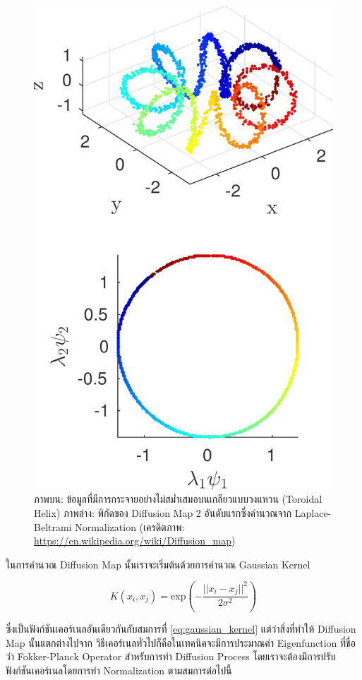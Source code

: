 \begin{figure}[htbp]
    \centering
    \includegraphics[width=0.7\linewidth]{fig/diffusion_map.jpg}
    \caption{ภาพบน: ข้อมูลที่มีการกระจายอย่างไม่สม่ำเสมอบนเกลียวแบบวงแหวน (Toroidal Helix) ภาพล่าง: พิกัดของ Diffusion Map 
    2 อันดับแรกซึ่งคำนวณจาก Laplace-Beltrami Normalization 
    (เครดิตภาพ: \url{https://en.wikipedia.org/wiki/Diffusion_map})}
    \label{fig:diffusion_map}
\end{figure}

ในการคำนวณ Diffusion Map นั้นเราจะเริ่มต้นด้วยการคำนวณ Gaussian Kernel

\begin{equation}
    K(x_{i}, x_{j}) = \mathrm{exp}\left( -\frac{||x_i-x_j||^2}{2\sigma^2} \right)
\end{equation}

\noindent ซึ่งเป็นฟังก์ชันเคอร์เนลอันเดียวกันกับสมการที่ \ref{eq:gaussian_kernel} แต่ว่าสิ่งที่ทำให้ Diffusion Map นั้นแตกต่างไปจาก%
วิธีเคอร์เนลทั่วไปก็คือในเทคนิคจะมีการประมาณค่า Eigenfunction ที่ชื่อว่า Fokker-Planck Operator สำหรับการทำ Diffusion Process%
\autocite{trstanova2020} โดยเราจะต้องมีการปรับฟังก์ชันเคอร์เนลโดยการทำ Normalization\autocite{nadler2006} ตามสมการต่อไปนี้

